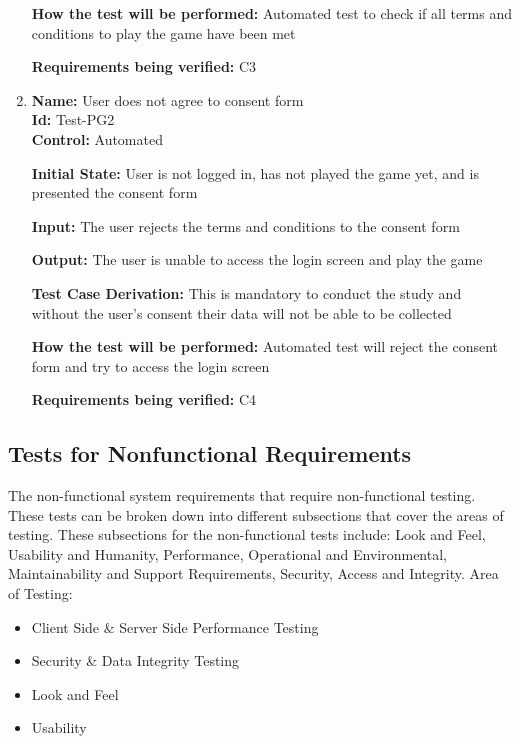 \documentclass[12pt, titlepage]{article}
\begin{document}
\begin{enumerate}
\textbf{How the test will be performed:} Automated test to check if all terms and conditions to play the game have been met

\textbf{Requirements being verified:} C3

\item{\textbf{Name:} User does not agree to consent form\\} %
\textbf{Id:} Test-PG2 \label{Test-PG2}\\

\textbf{Control:} Automated

\textbf{Initial State:} User is not logged in, has not played the game yet, and is presented the consent form

\textbf{Input:} The user rejects the terms and conditions to the consent form

\textbf{Output:} The user is unable to access the login screen and play the game

\textbf{Test Case Derivation:} This is mandatory to conduct the study and without the user's consent their data will not be able to be collected

\textbf{How the test will be performed:} Automated test will reject the consent form and try to access the login screen

\textbf{Requirements being verified:} C4


\end{enumerate}
\subsection{Tests for Nonfunctional Requirements}
\label{s5.2}



The non-functional system requirements that require non-functional testing. These tests can be broken down into different subsections that cover the areas of testing. These subsections for the non-functional tests include: Look and Feel, Usability and Humanity, Performance, Operational and Environmental, Maintainability and Support Requirements, Security, Access and Integrity.
Area of Testing:
\begin{itemize}
    \item Client Side \& Server Side Performance Testing
    \item Security \& Data Integrity Testing
    \item Look and Feel 
    \item Usability
\end{itemize}
\end{document}
